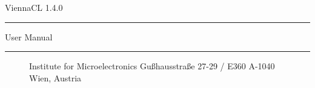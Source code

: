 
\begin{titlepage}

\vspace*{3cm}
\Huge{ViennaCL 1.4.0} 
\rule[0.0cm]{9.5cm}{0.05cm}
\begin{flushright}
\Large{User Manual}
\end{flushright}

\vspace{13cm}
\rule[0.0cm]{16.0cm}{0.05cm}
\begin{figure}[!ht]
   \vspace{-1.0cm}
   \centering
   \begin{minipage}{3cm}
   \end{minipage}
   \hfill
   \hspace{-0.5cm}
   \begin{minipage}{5.5cm}
      \vspace{0.5cm}
      \begin{center}
      Institute for Microelectronics\newline
      Gu\ss hausstra\ss e 27-29 / E360\newline 
      A-1040 Wien, Austria\newline
      \end{center}
   \end{minipage}   
   \hfill   
   \begin{minipage}{2.6cm}
   \end{minipage}
\end{figure}

\end{titlepage}

